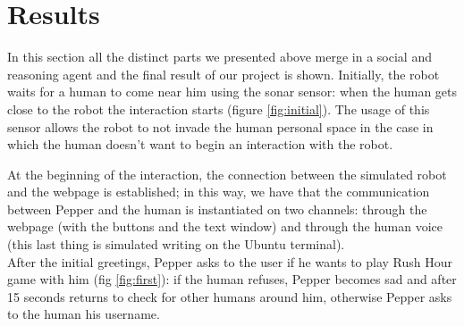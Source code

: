 \documentclass{article}
\begin{document}
\section{Results}
In this section all the distinct parts we presented above merge in a social and reasoning agent and the final result of our project is shown. Initially, the robot waits for a human to come near him using the sonar sensor: when the human gets close to the robot the interaction starts (figure \ref{fig:initial}). The usage of this sensor allows the robot to not invade the human personal space in the case in which the human doesn't want to begin an interaction with the robot. 

At the beginning of the interaction, the connection between the simulated robot and the webpage is established; in this way, we have that the communication between Pepper and the human is instantiated on two channels: through the webpage (with the buttons and the text window) and through the human voice (this last thing is simulated writing on the Ubuntu terminal).\\
\indent After the initial greetings, Pepper asks to the user if he wants to play Rush Hour game with him (fig \ref{fig:first}): if the human refuses, Pepper becomes sad and after 15 seconds returns to check for other humans around him, otherwise Pepper asks to the human his username.
\end{document}
